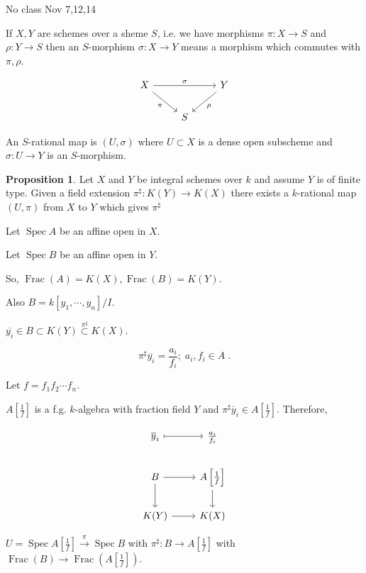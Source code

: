 \documentclass{article}
\theoremstyle{definition}
\newtheorem{proposition}[theorem]{Proposition}
\begin{document}
    No class Nov 7,12,14

    If \(X,Y\) are schemes over a sheme \(S\), i.e. we have morphisms \(\pi : X \to S\) and \(\rho: Y \to S\) then an \(S\)-morphism \(\sigma : X\to Y\) means a morphism which commutes with \(\pi, \rho\).

    \[
        \begin{tikzcd}
            X \ar[rr,"\sigma"] \ar[rd,"\pi"'] & & Y \ar[ld, "\rho"] \\ & S
        \end{tikzcd}
    \]

    An \(S\)-rational map is \((U,\sigma)\) where \(U \subset X\) is a dense open subscheme and \(\sigma: U \to Y\) is an \(S\)-morphism.
    
    \begin{proposition}
        Let \(X\) and \(Y\) be integral schemes over \(k\) and assume \(Y\) is of finite type. Given a field extension \(\pi^\sharp : K(Y) \to K(X)\) there exists a \(k\)-rational map \((U,\pi)\) from \(X\) to \(Y\) which gives \(\pi^\sharp\)  
    \end{proposition}

    Let \(\operatorname{Spec} A\) be an affine open in \(X\).

    Let \(\operatorname{Spec} B\) be an affine open in \(Y\).

    So, \(\operatorname{Frac} (A) = K(X) , \operatorname{Frac} (B) = K(Y)\).

    Also \(B = k[y_1 , \cdots , y_n] / I\).

    \(\overline{y_i} \in B \subset K(Y) \overset{\pi^\sharp}{\subset} K(X)\).
    
    \[
        \pi^\sharp \overline{y_i} = \frac{a_i}{f_i};\; a_i , f_i \in A\;.
    \]

    Let \(f = f_1 f_2 \cdots f_n\).

    \(A \left[ \frac{1}{f} \right]\) is a f.g. \(k\)-algebra with fraction field \(Y\) and \(\pi^\sharp \overline{y}_i \in A \left[ \frac{1}{f} \right] \). Therefore,

    \[
        \begin{tikzcd}
            \overline{y}_i \ar[r, mapsto] & \frac{a_i}{f_i} \\
            B \ar[r] \ar[d] & A \left[ \frac{1}{f} \right] \ar[d] \\ K(Y) \ar[r] & K(X) 
        \end{tikzcd}
    \]

    \(U = \operatorname{Spec} A \left[ \frac{1}{f} \right] \xrightarrow{\pi} \operatorname{Spec} B\) with \(\pi^\sharp : B \to A \left[ \frac{1}{f} \right] \) with \(\operatorname{Frac} (B) \to \operatorname{Frac} \left( A \left[ \frac{1}{f} \right]  \right)\).
    
\end{document}
